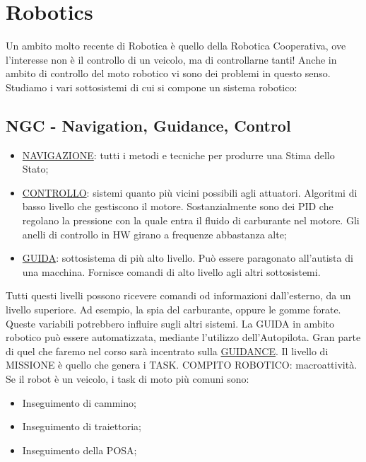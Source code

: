 
\chapter{Robotics}
\label{cap:rob}

Un ambito molto recente di Robotica è quello della Robotica Cooperativa, ove l'interesse non è il controllo di un veicolo, ma di controllarne tanti! Anche in ambito di controllo del moto robotico vi sono dei problemi in questo senso. Studiamo i vari sottosistemi di cui si compone un sistema robotico:

\section{NGC - Navigation, Guidance, Control}

\begin{itemize}

\item{\underline{NAVIGAZIONE}}: tutti i metodi e tecniche per produrre una Stima dello Stato;
\item{\underline{CONTROLLO}}: sistemi quanto più vicini possibili agli attuatori. Algoritmi di basso livello che gestiscono il motore. Sostanzialmente sono dei PID che regolano la pressione con la quale entra il fluido di carburante nel motore. Gli anelli di controllo in HW girano a frequenze abbastanza alte;
\item{\underline{GUIDA}}: sottosistema di più alto livello. Può essere paragonato all'autista di una macchina. Fornisce comandi di alto livello agli altri sottosistemi.
\end{itemize}

Tutti questi livelli possono ricevere comandi od informazioni dall'esterno, da un livello superiore. Ad esempio, la spia del carburante, oppure le gomme forate. Queste variabili potrebbero influire sugli altri sistemi.
La GUIDA in ambito robotico può essere automatizzata, mediante l'utilizzo dell'Autopilota. Gran parte di quel che faremo nel corso sarà incentrato sulla \underline{GUIDANCE}. Il livello di MISSIONE è quello che genera i TASK. COMPITO ROBOTICO: macroattività. Se il robot è un veicolo, i task di moto più comuni sono:

\begin{itemize}

\item{Inseguimento di cammino};
\item{Inseguimento di traiettoria};
\item{Inseguimento della POSA};
\end{itemize}

